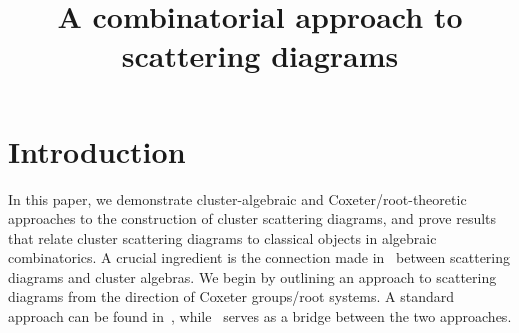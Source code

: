 \documentclass[ALCO,ThmDefs,Unicode,epreuves]{cedram}
\author{\firstname{Nathan} \lastname{Reading}}
\title{A combinatorial approach to scattering diagrams}
\begin{document}
\maketitle

\section{Introduction}\label{intro sec} 
In this paper, we demonstrate cluster-algebraic and Coxeter/root-theoretic approaches to the construction of cluster scattering diagrams, and prove results that relate cluster scattering diagrams to classical objects in algebraic combinatorics.
A crucial ingredient is the connection made in~\cite{GHKK} between scattering diagrams and cluster algebras.
We begin by outlining an approach to scattering diagrams from the direction of Coxeter groups/root systems.
A standard approach can be found in~\cite{GHKK,KS}, while~\cite{scatfan} serves as a bridge between the two approaches.


%
%



\end{document}
